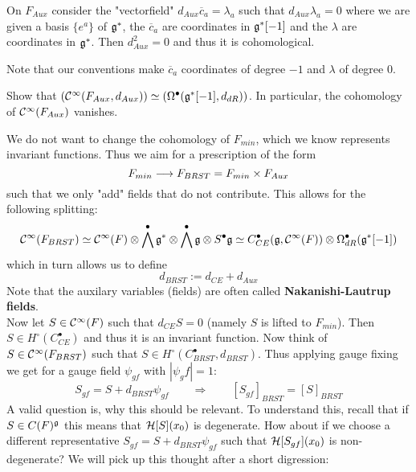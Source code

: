 \begin{lem}
  On $F_{Aux}$ consider the "vectorfield" $d_{Aux} \overline{c}_a = \lambda_a$ such that $d_{Aux} \lambda_a = 0$ where we are given a basis $\{e^a\}$ of $\mathfrak{g}^*$, the $\overline{c}_a$ are coordinates in $\mathfrak{g}^*[-1]$ and the $\lambda$ are coordinates in $\mathfrak{g}^*$. Then $d^2_{Aux} = 0$ and thus it is cohomological.
\end{lem}

Note that our conventions make $\overline{c}_a$ coordinates of degree $-1$ and $\lambda$ of degree $0$.

\begin{ex}
  Show that $\left( \mathcal{C}^{\infty}(F_{Aux}, d_{Aux}) \right) \simeq \left( \Omega^\bullet(\mathfrak{g}^*[-1], d_{dR}) \right)$. In particular, the cohomology of $\mathcal{C}^{\infty}(F_{Aux})$ vanishes.
\end{ex}

We do not want to change the cohomology of $F_{min}$, which we know represents invariant functions. Thus we aim for a prescription of the form
$$ F_{min} \longrightarrow F_{BRST} = F_{min} \times F_{Aux} $$
such that we only "add" fields that do not contribute. This allows for the following splitting:
$$ \mathcal{C}^{\infty}(F_{BRST}) \simeq \mathcal{C}^{\infty}(F) \otimes \bigwedge^\bullet \mathfrak{g}^* \otimes \bigwedge^\bullet \mathfrak{g} \otimes S^\bullet \mathfrak{g} \simeq C_{CE}^\bullet (\mathfrak{g}, \mathcal{C}^{\infty}(F)) \otimes \Omega^\bullet_{dR}(\mathfrak{g}^*[-1]) $$
which in turn allows us to define
\begin{equation}
  d_{BRST} := d_{CE} + d_{Aux}
\end{equation}
Note that the auxilary variables (fields) are often called \textbf{Nakanishi-Lautrup fields}.\\

Now let $S \in \mathcal{C}^{\infty}(F)$ such that $d_{CE} S = 0$ (namely $S$ is lifted to $F_{min}$). Then $S \in H^\circ (C^\bullet_{CE})$ and thus it is an invariant function. Now think of $S \in \mathcal{C}^{\infty}(F_{BRST})$ such that $S \in H^\circ(C^\bullet_{BRST}, d_{BRST})$. Thus applying gauge fixing we get for a gauge field $\psi_{gf}$ with $|\psi_gf| = 1$:
\begin{equation}
  S_{gf} = S + d_{BRST} \psi_{gf} \quad \quad \Longrightarrow \quad \quad  [S_{gf}]_{BRST} = [S]_{BRST}
\end{equation}
A valid question is, why this should be relevant. To understand this, recall that if $S \in C(F)^{\mathfrak{g}}$ this means that ${\mathcal{H}}[S](x_0)$ is degenerate. How about if we choose a different representative $S_{gf} = S + d_{BRST} \psi_{gf}$ such that ${\mathcal{H}}[S_{gf}](x_0)$ is non-degenerate? We will pick up this thought after a short digression:

